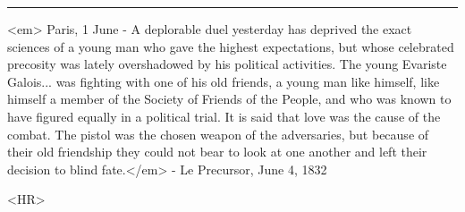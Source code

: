 \par\noindent\rule{\textwidth}{0.4pt}
<em>
Paris, 1 June - A deplorable duel yesterday has deprived the exact 
sciences of a young man who gave the highest expectations, but whose 
celebrated precosity was lately overshadowed by his political activities.  
The young Evariste Galois... was fighting with one of his old friends,
a young man like himself, like himself a member of the Society of
Friends of the People, and who was known to have figured equally in
a political trial.  It is said that love was the cause of the combat.
The pistol was the chosen weapon of the adversaries, but because of
their old friendship they could not bear to look at one another and 
left their decision to blind fate.</em> - Le Precursor, June 4, 1832

<HR>



